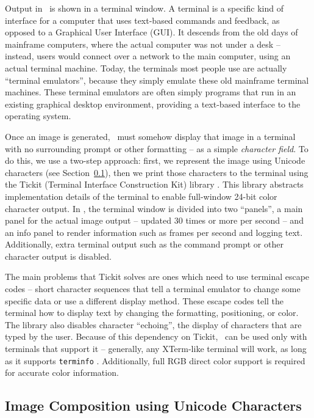 Output in \name\ is shown in a terminal window.
A terminal is a specific kind of interface for a computer that uses text-based commands and feedback, as opposed to a Graphical User Interface (GUI).
It descends from the old days of mainframe computers, where the actual computer was not under a desk -- instead, users would connect over a network to the main computer, using an actual terminal machine.
Today, the terminals most people use are actually ``terminal emulators'', because they simply emulate these old mainframe terminal machines.
These terminal emulators are often simply programs that run in an existing graphical desktop environment, providing a text-based interface to the operating system.

Once an image is generated, \name\ must somehow display that image in a terminal with no surrounding prompt or other formatting -- as a simple {\it character field}.
To do this, we use a two-step approach: first, we represent the image using Unicode characters (see Section~\ref{ch:intro:overview:unicode}), then we print those characters to the terminal using the Tickit (Terminal Interface Construction Kit) library \cite{libtickitLibrary}.
This library abstracts implementation details of the terminal to enable full-window 24-bit color character output.
In \name, the terminal window is divided into two ``panels'', a main panel for the actual image output -- updated 30 times or more per second -- and an info panel to render information such as frames per second and logging text.
Additionally, extra terminal output such as the command prompt or other character output is disabled.

The main problems that Tickit solves are ones which need to use terminal escape codes -- short character sequences that tell a terminal emulator to change some specific data or use a different display method.
These escape codes tell the terminal how to display text by changing the formatting, positioning, or color.
The library also disables character ``echoing'', the display of characters that are typed by the user.
Because of this dependency on Tickit, \name\ can be used only with terminals that support it -- generally, any XTerm-like terminal will work, as long as it supports \texttt{terminfo} \cite{libtickitLibrary}.
Additionally, full RGB direct color support is required for accurate color information.

\subsection{Image Composition using Unicode Characters}
\label{ch:intro:overview:unicode}


